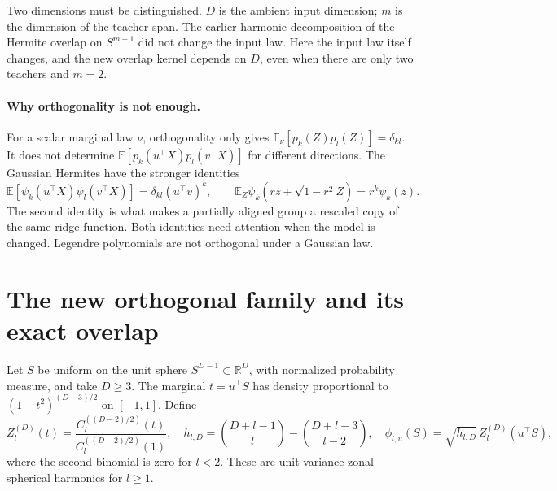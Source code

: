 \documentclass[11pt]{article}
\newcommand{\E}{\mathbb E}
\newcommand{\R}{\mathbb R}
\theoremstyle{remark}
\begin{document}
Two dimensions must be distinguished. $D$ is the ambient input dimension;
$m$ is the dimension of the teacher span. The earlier harmonic decomposition
of the Hermite overlap on $S^{m-1}$ did not change the input law. Here the
input law itself changes, and the new overlap kernel depends on $D$, even
when there are only two teachers and $m=2$.

\paragraph{Why orthogonality is not enough.}
For a scalar marginal law $\nu$, orthogonality only gives
$\E_\nu[p_k(Z)p_l(Z)]=\delta_{kl}$. It does not determine
$\E[p_k(u^\top X)p_l(v^\top X)]$ for different directions. The Gaussian
Hermites have the stronger identities
\begin{equation}\label{eq:hermite}
 \E[\psi_k(u^\top X)\psi_l(v^\top X)]=\delta_{kl}(u^\top v)^k,
 \qquad
 \E_Z\psi_k(rz+\sqrt{1-r^2}Z)=r^k\psi_k(z).
\end{equation}
The second identity is what makes a partially aligned group a rescaled copy
of the same ridge function. Both identities need attention when the model
is changed. Legendre polynomials are not orthogonal under a Gaussian law.

\section{The new orthogonal family and its exact overlap}

Let $S$ be uniform on the unit sphere $S^{D-1}\subset\R^D$, with normalized
probability measure, and take $D\geq3$. The marginal $t=u^\top S$ has density
proportional to $(1-t^2)^{(D-3)/2}$ on $[-1,1]$. Define
\begin{equation}
 Z_l^{(D)}(t)=\frac{C_l^{((D-2)/2)}(t)}{C_l^{((D-2)/2)}(1)},
 \quad h_{l,D}=\binom{D+l-1}{l}-\binom{D+l-3}{l-2},
 \quad \phi_{l,u}(S)=\sqrt{h_{l,D}}\,Z_l^{(D)}(u^\top S),
\end{equation}
where the second binomial is zero for $l<2$. These are unit-variance
zonal spherical harmonics for $l\geq1$.
\end{document}
